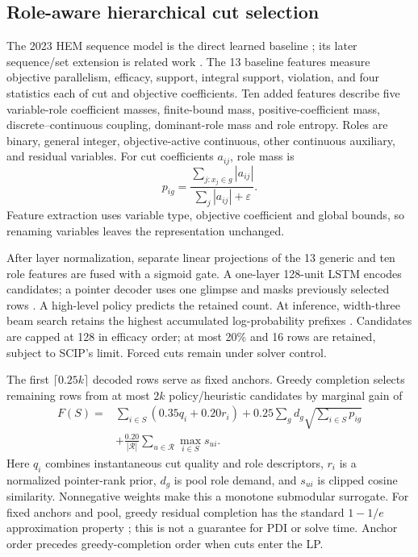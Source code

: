 \documentclass[journal]{IEEEtran}
\begin{document}
\subsection{Role-aware hierarchical cut selection}
The 2023 HEM sequence model is the direct learned baseline \cite{wang2023hem}; its later sequence/set extension is related work \cite{wang2024hemset}. The 13 baseline features measure objective parallelism, efficacy, support, integral support, violation, and four statistics each of cut and objective coefficients. Ten added features describe five variable-role coefficient masses, finite-bound mass, positive-coefficient mass, discrete--continuous coupling, dominant-role mass and role entropy. Roles are binary, general integer, objective-active continuous, other continuous auxiliary, and residual variables. For cut coefficients $a_{ij}$, role mass is
\begin{equation}
p_{ig}=\frac{\sum_{j:x_j\in g}|a_{ij}|}{\sum_j|a_{ij}|+\varepsilon}.
\end{equation}
Feature extraction uses variable type, objective coefficient and global bounds, so renaming variables leaves the representation unchanged.

After layer normalization, separate linear projections of the 13 generic and ten role features are fused with a sigmoid gate. A one-layer 128-unit LSTM encodes candidates; a pointer decoder uses one glimpse and masks previously selected rows \cite{vinyals2015pointer}. A high-level policy predicts the retained count. At inference, width-three beam search retains the highest accumulated log-probability prefixes \cite{choo2022beam}. Candidates are capped at 128 in efficacy order; at most 20\% and 16 rows are retained, subject to SCIP's limit. Forced cuts remain under solver control.

The first $\lceil0.25k\rceil$ decoded rows serve as fixed anchors. Greedy completion selects remaining rows from at most $2k$ policy/heuristic candidates by marginal gain of
\begin{equation}
\begin{aligned}
F(S)={}&\sum_{i\in S}(0.35q_i+0.20r_i)
+0.25\sum_g d_g\sqrt{\sum_{i\in S}p_{ig}}\\
&+\frac{0.20}{|\mathcal R|}\sum_{u\in\mathcal R}\max_{i\in S}s_{ui}.
\end{aligned}
\end{equation}
Here $q_i$ combines instantaneous cut quality and role descriptors, $r_i$ is a normalized pointer-rank prior, $d_g$ is pool role demand, and $s_{ui}$ is clipped cosine similarity. Nonnegative weights make this a monotone submodular surrogate. For fixed anchors and pool, greedy residual completion has the standard $1-1/e$ approximation property \cite{nemhauser1978analysis}; this is not a guarantee for PDI or solve time. Anchor order precedes greedy-completion order when cuts enter the LP.
\end{document}
